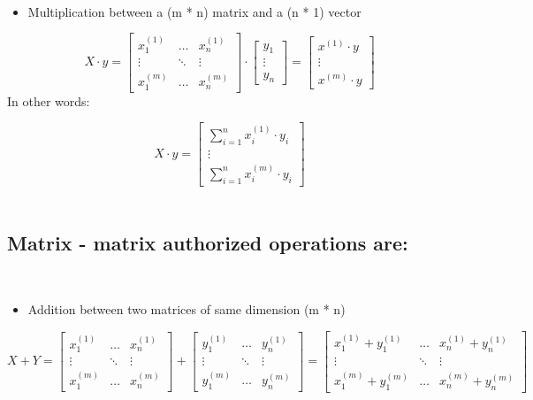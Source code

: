 \documentclass[]{article}
\providecommand{\tightlist}{%
  \setlength{\itemsep}{0pt}\setlength{\parskip}{0pt}}
\begin{document}
​

\begin{itemize}
\tightlist
\item
  Multiplication between a (m * n) matrix and a (n * 1) vector
\end{itemize}

\large

\[
X \cdot y = 
\begin{bmatrix} x^{(1)}_1 & \dots& x^{(1)}_n \\ 
\vdots & \ddots & \vdots \\ 
x^{(m)}_1 & \dots & x^{(m)}_n
\end{bmatrix} 
\cdot 
\begin{bmatrix} 
y_1 \\
\vdots \\ 
y_n 
\end{bmatrix} 
= 
\begin{bmatrix} x^{(1)} \cdot y \\ \vdots  \\ x^{(m)} \cdot y \end{bmatrix}
\] \normalsize ​ In other words:

\large

\[
X \cdot y = \begin{bmatrix} \sum_{i = 1}^{n} x_{i}^{(1)} \cdot y_i \\ \vdots \\ \sum_{i = 1}^{n} x_{i}^{(m)} \cdot y_i \end{bmatrix}
\] \normalsize ​

\hypertarget{matrix---matrix-authorized-operations-are}{%
\subsection{Matrix - matrix authorized operations
are:}\label{matrix---matrix-authorized-operations-are}}

​

\begin{itemize}
\tightlist
\item
  Addition between two matrices of same dimension (m * n)
\end{itemize}

\large

\[
X + Y = 
\begin{bmatrix} 
x_{1}^{(1)} & \dots & x_{n}^{(1)}  \\ 
\vdots & \ddots & \vdots \\ 
x_{1}^{(m)} & \dots & x_{n}^{(m)} 
\end{bmatrix} +  
\begin{bmatrix} 
y_{1}^{(1)} & \dots & y_{n}^{(1)}  \\ 
\vdots & \ddots & \vdots \\ 
y_{1}^{(m)} & \dots & y_{n}^{(m)} 
\end{bmatrix} = 
\begin{bmatrix} 
x_{1}^{(1)} + y_{1}^{(1)}  & \dots & x_{n}^{(1)} + y_{n}^{(1)}  \\ 
\vdots & \ddots & \vdots \\ 
x_{1}^{(m)} + y_{1}^{(m)} & \dots & x_{n}^{(m)} + y_{n}^{(m)}
\end{bmatrix}
\] \normalsize ​
\end{document}
